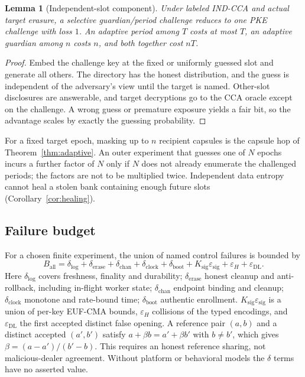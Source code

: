 \documentclass[pdflatex,sn-mathphys-num]{sn-jnl}
\theoremstyle{plain}
\newtheorem{lemma}[theorem]{Lemma}
\theoremstyle{definition}
\begin{document}
\begin{lemma}[Independent-slot component]\label{lem:slot}
Under labeled IND-CCA and actual target erasure, a selective guardian/period challenge reduces to one PKE challenge with loss $1$. An adaptive period among $T$ costs at most $T$, an adaptive guardian among $n$ costs $n$, and both together cost $nT$.
\end{lemma}
\begin{proof}
Embed the challenge key at the fixed or uniformly guessed slot and generate all others. The directory has the honest distribution, and the guess is independent of the adversary's view until the target is named. Other-slot disclosures are answerable, and target decryptions go to the CCA oracle except on the challenge. A wrong guess or premature exposure yields a fair bit, so the advantage scales by exactly the guessing probability.
\end{proof}

For a fixed target epoch, masking up to $n$ recipient capsules is the capsule hop of Theorem~\ref{thm:adaptive}. An outer experiment that guesses one of $N$ epochs incurs a further factor of $N$ only if $N$ does not already enumerate the challenged periods; the factors are not to be multiplied twice. Independent data entropy cannot heal a stolen bank containing enough future slots (Corollary~\ref{cor:healing}).

\subsection{Failure budget}
For a chosen finite experiment, the union of named control failures is bounded by
\begin{equation}\label{eq:budget}
 B_{\mathrm{all}}=\delta_{\mathrm{log}}+\delta_{\mathrm{erase}}+\delta_{\mathrm{chan}}+\delta_{\mathrm{clock}}+\delta_{\mathrm{boot}}+K_{\mathrm{sig}}\varepsilon_{\mathrm{sig}}+\varepsilon_H+\varepsilon_{\mathrm{DL}}.
\end{equation}
Here $\delta_{\mathrm{log}}$ covers freshness, finality and durability; $\delta_{\mathrm{erase}}$ honest cleanup and anti-rollback, including in-flight worker state; $\delta_{\mathrm{chan}}$ endpoint binding and cleanup; $\delta_{\mathrm{clock}}$ monotone and rate-bound time; $\delta_{\mathrm{boot}}$ authentic enrollment. $K_{\mathrm{sig}}\varepsilon_{\mathrm{sig}}$ is a union of per-key EUF-CMA bounds, $\varepsilon_H$ collisions of the typed encodings, and $\varepsilon_{\mathrm{DL}}$ the first accepted distinct false opening. A reference pair $(a,b)$ and a distinct accepted $(a',b')$ satisfy $a+\beta b=a'+\beta b'$ with $b\ne b'$, which gives $\beta=(a-a')/(b'-b)$. This requires an honest reference sharing, not malicious-dealer agreement. Without platform or behavioral models the $\delta$ terms have no asserted value.
\end{document}
